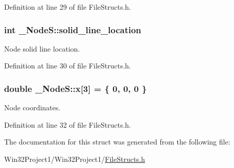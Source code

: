 Definition at line 29 of file File\+Structs.\+h.

\subsubsection[{\texorpdfstring{solid\+\_\+line\+\_\+location}{solid_line_location}}]{\setlength{\rightskip}{0pt plus 5cm}int \+\_\+\+Node\+S\+::solid\+\_\+line\+\_\+location}\hypertarget{struct___node_s_a486190cb5907d2695e87793dce313bbf}{}\label{struct___node_s_a486190cb5907d2695e87793dce313bbf}


Node solid line location. 



Definition at line 30 of file File\+Structs.\+h.

\subsubsection[{\texorpdfstring{x}{x}}]{\setlength{\rightskip}{0pt plus 5cm}double \+\_\+\+Node\+S\+::x\mbox{[}3\mbox{]} = \{ 0, 0, 0 \}}\hypertarget{struct___node_s_ab60b09e8b5b8009b574b9a0a49dd63fa}{}\label{struct___node_s_ab60b09e8b5b8009b574b9a0a49dd63fa}


Node coordinates. 



Definition at line 32 of file File\+Structs.\+h.



The documentation for this struct was generated from the following file\+:\begin{DoxyCompactItemize}
\item 
Win32\+Project1/\+Win32\+Project1/\hyperlink{_file_structs_8h}{File\+Structs.\+h}\end{DoxyCompactItemize}
